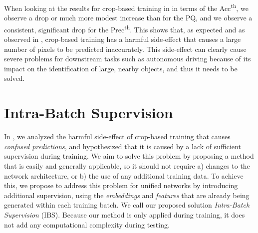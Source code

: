 \documentclass[10pt,twocolumn,letterpaper]{article}
\begin{document}
When looking at the results for crop-based training in  in terms of the Acc\textsuperscript{th}, we observe a drop or much more modest increase than for the PQ, and we observe a consistent, significant drop for the Prec\textsuperscript{th}. This shows that, as expected and as observed in , crop-based training has a harmful side-effect that causes a large number of pixels to be predicted inaccurately. This side-effect can clearly cause severe problems for downstream tasks such as autonomous driving because of its impact on the identification of large, nearby objects, and thus it needs to be solved.























 
\section{Intra-Batch Supervision}
\label{sec:method}
In , we analyzed the harmful side-effect of crop-based training that causes \textit{confused predictions}, and hypothesized that it is caused by a lack of sufficient supervision during training. We aim to solve this problem by proposing a method that is easily and generally applicable, so it should not require a) changes to the network architecture, or b) the use of any additional training data. To achieve this, we propose to address this problem for unified networks by introducing additional supervision, using the \textit{embeddings} and \textit{features} that are already being generated within each training batch. We call our proposed solution \textit{Intra-Batch Supervision} (IBS). Because our method is only applied during training, it does not add any computational complexity during testing.
\end{document}
